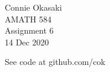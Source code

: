\documentclass[letter, 12pt]{article}
\begin{document}
\parindent=0in
\newenvironment{problem}[1][]
   {\begin{framed} \textbf{Problem \theprobnum: #1}}
   {\end{framed}\stepcounter{probnum}}
\newenvironment{bookproblem}[1]
   {\begin{framed} \textbf{Problem #1:}}
   {\end{framed}\stepcounter{probnum}}

\begin{flushright}
Connie Okasaki \\
AMATH 584\\
Assignment 6\\
14 Dec 2020
\end{flushright}

See code at github.com/cok
\end{document}
